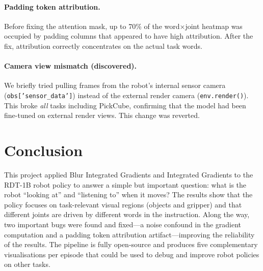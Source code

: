 \documentclass[11pt,a4paper]{article}
\begin{document}
\paragraph{Padding token attribution.}
Before fixing the attention mask, up to 70\% of the word$\times$joint
heatmap was occupied by padding columns that appeared to have high
attribution. After the fix, attribution correctly concentrates on the
actual task words.

\paragraph{Camera view mismatch (discovered).}
We briefly tried pulling frames from the robot's internal sensor camera
(\texttt{obs['sensor\_data']}) instead of the external render camera
(\texttt{env.render()}). This broke \emph{all} tasks including PickCube,
confirming that the model had been fine-tuned on external render views.
This change was reverted.

\section{Conclusion}

This project applied Blur Integrated Gradients and Integrated Gradients to
the RDT-1B robot policy to answer a simple but important question: what is
the robot ``looking at'' and ``listening to'' when it moves? The results show
that the policy focuses on task-relevant visual regions (objects and gripper)
and that different joints are driven by different words in the instruction.
Along the way, two important bugs were found and fixed---a noise confound in
the gradient computation and a padding token attribution artifact---improving
the reliability of the results. The pipeline is fully open-source and
produces five complementary visualisations per episode that could be used to
debug and improve robot policies on other tasks.
\end{document}

